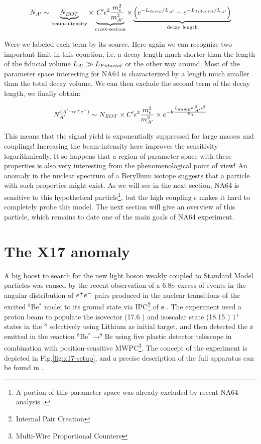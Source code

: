 \begin{equation}
  \label{eq:dm-rate-vis}
    N_{A'} \sim \underbrace{N_{EOT}}_{\textrm{beam-intensity}} \times \underbrace{C' \epsilon^2 \frac{m_e^2}{m^2_{A'}}}_{\textrm{cross-section}} \times \underbrace{\left(e^{- L_{dump}/L_{A'}} - e^{-L_{fiducial}/L_{A'}}\right)}_{\textrm{decay length}}
  \end{equation}

  Were we labeled each term by its source. Here again we can recognize two important limit in this equation, i.e. a decay length much shorter than the length of the fiducial volume $L_{A'} \gg L_{Fiducial}$ or the other way around. Most of the parameter space interesting for NA64 is characterized by a length much smaller than the total decay volume. We can then exclude the second term of the decay length, we finally obtain:

  \begin{equation}
    \label{eq:dm-rate-vis-limit}
    N_{A'}^{(A' \to e^+e^-)} \sim N_{EOT} \times C' \epsilon^2 \frac{m_e^2}{m^2_{A'}} \times e^{-k\frac{L_{dump} m^2_{A'}\epsilon^2}{E_0}}
  \end{equation}

  This means that the signal yield is exponentially suppressed for large masses and couplings! Increasing the beam-intensity here improves the sensitivity logarithmically. It so happens that a region of parameter space with these properties is also very interesting from the phenomenological point of view! An anomaly in the nuclear spectrum of a Beryllium isotope suggests that a particle with such properties might exist. As we will see in the next section, NA64 is sensitive to this hypothetical particle\footnote{A portion of this parameter space was already excluded by recent NA64 analysis \cite{Banerjee:2019hmi,Banerjee:2018vgk}.}, but the high coupling $\epsilon$ makes it hard to completely probe this model. The next section will give an overview of this particle, which remains to date one of the main goals of NA64 experiment.

\section{The X17 anomaly}
\label{ch1:sec:dm-u1model-motivations-x17}

A big boost to search for the new light boson weakly coupled to Standard Model particles was caused by the recent observation of a 6.8$\sigma$ excess of events in the angular distribution of $e^+e^-$ pairs produced in the nuclear transitions of the excited $^8$Be$^*$ nuclei to its ground state via IPC\footnote{Internal Pair Creation} of $\ee$ \cite{Krasznahorkay:2015iga}. The experiment used a proton beam to populate the isovector (17.6 \mev) and isoscalar state (18.15 \mev) 1$^+$ states in the $^8$ selectively using Lithium as initial target, and then detected the $\ee$ emitted in the reaction $^8$Be$^* \to ^8$Be using five plastic detector telescope in combination with position-sensitive MWPC\footnote{Multi-Wire Proportional Counters}. The concept of the experiment is depicted in Fig.\ref{fig:x17-setup}, and a precise description of the full apparatus can be found in \cite{GULYAS201621}.

